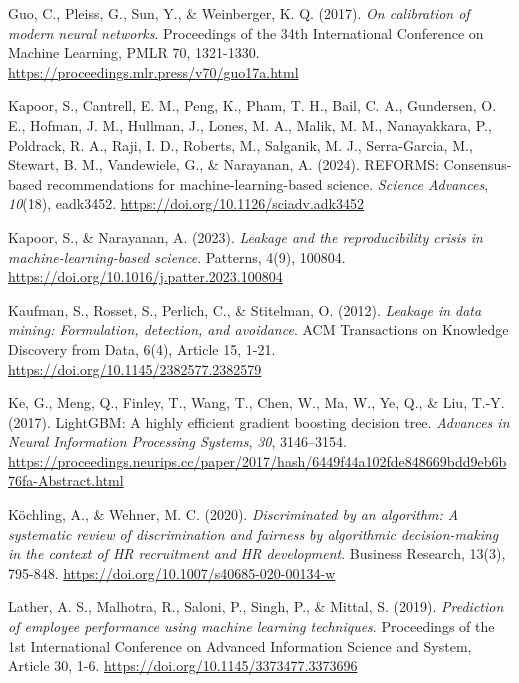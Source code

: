 \documentclass[
  a4paper,
  review]{elsarticle}
\newlength{\cslhangindent}
\newenvironment{CSLReferences}[2] %
 {\begin{list}{}{%
  \setlength{\itemindent}{0pt}
  \setlength{\leftmargin}{0pt}
  \setlength{\parsep}{0pt}
  \ifodd #1
   \setlength{\leftmargin}{\cslhangindent}
   \setlength{\itemindent}{-1\cslhangindent}
  \fi
  \setlength{\itemsep}{#2\baselineskip}}}
 {\end{list}}
\begin{document}
\begin{CSLReferences}{1}{0}
Guo, C., Pleiss, G., Sun, Y., \& Weinberger, K. Q. (2017). \emph{On
calibration of modern neural networks}. Proceedings of the 34th
International Conference on Machine Learning, PMLR 70, 1321-1330.
\url{https://proceedings.mlr.press/v70/guo17a.html}

Kapoor, S., Cantrell, E. M., Peng, K., Pham, T. H., Bail, C. A.,
Gundersen, O. E., Hofman, J. M., Hullman, J., Lones, M. A., Malik, M.
M., Nanayakkara, P., Poldrack, R. A., Raji, I. D., Roberts, M.,
Salganik, M. J., Serra-Garcia, M., Stewart, B. M., Vandewiele, G., \&
Narayanan, A. (2024). {REFORMS}: Consensus-based recommendations for
machine-learning-based science. \emph{Science Advances}, \emph{10}(18),
eadk3452. \url{https://doi.org/10.1126/sciadv.adk3452}

Kapoor, S., \& Narayanan, A. (2023). \emph{Leakage and the
reproducibility crisis in machine-learning-based science}. Patterns,
4(9), 100804. \url{https://doi.org/10.1016/j.patter.2023.100804}

Kaufman, S., Rosset, S., Perlich, C., \& Stitelman, O. (2012).
\emph{Leakage in data mining: Formulation, detection, and avoidance}.
ACM Transactions on Knowledge Discovery from Data, 6(4), Article 15,
1-21. \url{https://doi.org/10.1145/2382577.2382579}

Ke, G., Meng, Q., Finley, T., Wang, T., Chen, W., Ma, W., Ye, Q., \&
Liu, T.-Y. (2017). {LightGBM}: A highly efficient gradient boosting
decision tree. \emph{Advances in Neural Information Processing Systems},
\emph{30}, 3146--3154.
\url{https://proceedings.neurips.cc/paper/2017/hash/6449f44a102fde848669bdd9eb6b76fa-Abstract.html}

Köchling, A., \& Wehner, M. C. (2020). \emph{Discriminated by an
algorithm: A systematic review of discrimination and fairness by
algorithmic decision-making in the context of HR recruitment and HR
development}. Business Research, 13(3), 795-848.
\url{https://doi.org/10.1007/s40685-020-00134-w}

Lather, A. S., Malhotra, R., Saloni, P., Singh, P., \& Mittal, S.
(2019). \emph{Prediction of employee performance using machine learning
techniques}. Proceedings of the 1st International Conference on Advanced
Information Science and System, Article 30, 1-6.
\url{https://doi.org/10.1145/3373477.3373696}


\end{CSLReferences}
\end{document}
